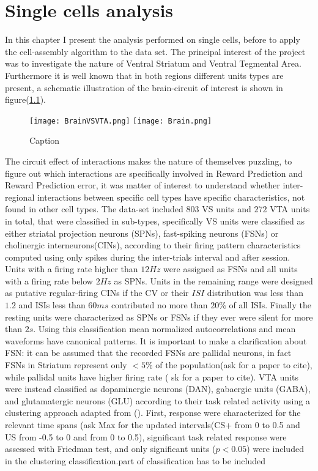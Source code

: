 \chapter{Single cells analysis}
\label{chap:UnitsAnalysis}
In this chapter I present the analysis performed on single cells, before to apply the cell-assembly algorithm to the data set.
The principal interest of the project was to investigate the nature of Ventral Striatum and Ventral Tegmental Area. Furthermore it is well known that in both regions different units types are present, a schematic illustration of the brain-circuit of interest is shown in figure(\ref{fig:Brain}).
\begin{figure}
    \centering
    \texttt{[image: BrainVSVTA.png]}
    \texttt{[image: Brain.png]}
    \caption{Caption}
    \label{fig:Brain}
\end{figure}
The circuit effect of interactions makes the nature of themselves puzzling, to figure out which interactions are specifically involved in Reward Prediction and Reward Prediction error, it was matter of interest to understand whether inter-regional interactions between specific cell types have specific characteristics, not found in other cell types.
The data-set included $803$ VS units and $272$ VTA units in total, that were classified in sub-types, specifically VS units were classified as either striatal projection neurons (SPNs), fast-spiking neurons (FSNs) or cholinergic interneurons(CINs), according to their firing pattern characteristics computed using only spikes during the inter-trials interval and after session. Units with a firing rate higher than $12 Hz$ were assigned as FSNs and all units with a firing rate below $2 Hz$ as SPNs. Units in the remaining range were designed as putative regular-firing  CINs if the CV or their $ISI$ distribution was less than $1.2$ and ISIs less than $60 ms$ contributed no more than $20\%$ of all ISIs. Finally the resting units were characterized as SPNs or FSNs if they ever were silent for more than $2 s$. Using this classification mean normalized autocorrelations and mean waveforms have canonical patterns. It is important to make a clarification about FSN: it can be assumed that the recorded FSNs are pallidal neurons, in fact FSNs in Striatum represent only $<5\%$ of the population({\color{red}ask for a paper to cite}), while pallidal units have higher firing rate ({\color{red} sk for a paper to cite}). %
VTA units were instead classified as dopaminergic neurons (DAN), gabaergic units (GABA), and glutamatergic neurons (GLU) according to their task related activity using a clustering approach adapted from (\cite{Uchida}). First, response were characterized for the relevant time spans ({\color{red}ask Max for the updated intervals}(CS+ from 0 to 0.5 and US from -0.5 to 0 and from 0 to 0.5), significant task related response were assessed with Friedman test, and only significant units ($p<0.05$) were included in the clustering classification.{\color{red}part of classification has to be included}

